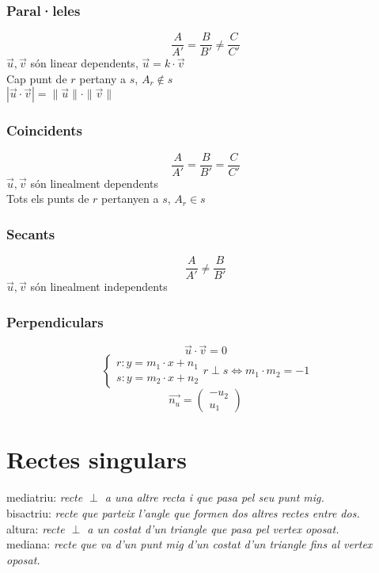 \documentclass[12pt,a4paper]{article}
\newcommand{\module}[1]{\|#1\|}
\begin{document}
\subsubsection{Paral·leles}

$$ \frac{A}{A'} = \frac{B}{B'} \neq \frac{C}{C'}$$
$\vec{u}, \vec{v}$ són linear dependents, $\vec{u} = k \cdot\vec{v}$\\
Cap punt de $r$ pertany a $s$, $A_r \notin s$\\
$|\vec{u}\cdot\vec{v}| = \module{\vec{u}}\cdot\module{\vec{v}}$
\\[10pt]
\subsubsection{Coincidents}
$$\frac{A}{A'}=\frac{B}{B'}=\frac{C}{C'}$$
$\vec{u}, \vec{v}$ són linealment dependents\\
Tots els punts de $r$ pertanyen a $s$, $A_r \in s$
\\[10pt]
\subsubsection{Secants}
$$\frac{A}{A'}\neq\frac{B}{B'}$$
$\vec{u},\vec{v}$ són linealment independents
\\[10pt]
\subsubsection{Perpendiculars}
$$\vec{u}\cdot\vec{v}=0$$
$$
\begin{cases}
    r: y = m_1 \cdot x + n_1 \\
    s: y = m_2 \cdot x + n_2
\end{cases}
r \perp s \Longleftrightarrow m_1 \cdot m_2 = -1
$$
$$\vec{n_u} = \begin{pmatrix}
    - u_2 \\
    u_1
\end{pmatrix}$$

\section{Rectes singulars}
mediatriu: \textit{recte $\perp$ a una altre recta i que pasa pel seu punt mig.}\\
bisactriu: \textit{recte que parteix l'angle que formen dos altres rectes entre dos.}\\
altura: \textit{recte $\perp$ a un costat d'un triangle que pasa pel vertex oposat.} \\
mediana: \textit{recte que va d'un punt mig d'un costat d'un triangle fins al vertex oposat.}\\
\end{document}
